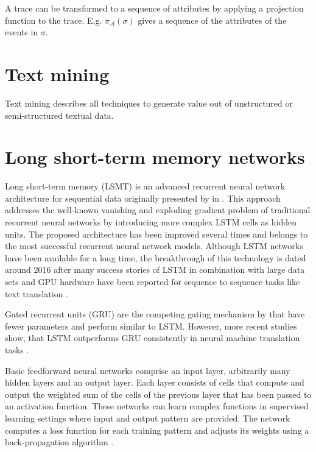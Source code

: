 A trace can be transformed to a sequence of attributes by applying a projection function to the trace.
E.g. $\pi_\mathcal{A}(\sigma)$ gives a sequence of the attributes of the events in $\sigma$.


\section{Text mining}

Text mining describes all techniques to generate value out of unstructured or semi-structured textual data.

\section{Long short-term memory networks}

Long short-term memory (LSMT) is an advanced recurrent neural network architecture for sequential data originally presented by \citeauthor{DBLP:journals/neco/HochreiterS97} in \citeyear{DBLP:journals/neco/HochreiterS97}  \cite{DBLP:journals/neco/HochreiterS97}.
This approach addresses the well-known vanishing and exploding gradient problem \cite{DBLP:conf/icml/PascanuMB13}  of traditional recurrent neural networks by introducing more complex LSTM cells as hidden units.
The proposed architecture has been improved several times \cite{DBLP:journals/neco/GersSC00} \cite {DBLP:journals/tnn/GreffSKSS17} and belongs to the most successful recurrent neural network models.
Although LSTM networks have been available for a long time, the breakthrough of this technology is dated around 2016 after many success stories of LSTM in combination with large data sets and GPU hardware have been reported for sequence to sequence tasks like text translation \cite{DBLP:journals/corr/WuSCLNMKCGMKSJL16}.


Gated recurrent units (GRU) \cite{DBLP:conf/emnlp/ChoMGBBSB14} are the competing gating mechanism by \citeauthor{DBLP:conf/emnlp/ChoMGBBSB14} that have fewer parameters and perform similar to LSTM.
However, more recent studies show, that LSTM outperforms GRU consistently in neural machine translation tasks \cite{DBLP:journals/corr/BritzGLL17}.

Basic feedforward neural networks comprise an input layer, arbitrarily many hidden layers and an output layer.
Each layer consists of cells that compute and output the weighted sum of the cells of the previous layer that has been passed to an activation function.
These networks can learn complex functions in supervised learning settings where input and output pattern are provided.
The network computes a loss function for each training pattern and adjusts its weights using a back-propagation algorithm \cite{rumelhart1986learning}.

